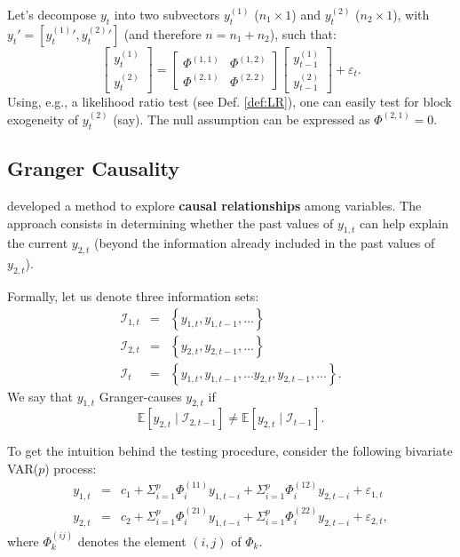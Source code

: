 \documentclass[
  12pt,
]{book}
\theoremstyle{definition}
\theoremstyle{definition}
\theoremstyle{definition}
\theoremstyle{definition}
\theoremstyle{remark}
\begin{document}
Let's decompose \(y_t\) into two subvectors \(y^{(1)}_{t}\) (\(n_1 \times 1\)) and \(y^{(2)}_{t}\) (\(n_2 \times 1\)), with \(y_t' = [{y^{(1)}_{t}}',{y^{(2)}_{t}}']\) (and therefore \(n=n_1 +n_2\)), such that:
\[
\left[
\begin{array}{c}
y^{(1)}_{t}\\
y^{(2)}_{t}
\end{array}
\right] = \left[
\begin{array}{cc}
\Phi^{(1,1)} & \Phi^{(1,2)}\\
\Phi^{(2,1)} & \Phi^{(2,2)}
\end{array}
\right]
\left[
\begin{array}{c}
y^{(1)}_{t-1}\\
y^{(2)}_{t-1}
\end{array}
\right] + \varepsilon_t.
\]
Using, e.g., a likelihood ratio test (see Def. \ref{def:LR}), one can easily test for block exogeneity of \(y_t^{(2)}\) (say). The null assumption can be expressed as \(\Phi^{(2,1)}=0\).

\hypertarget{granger-causality}{%
\subsection{Granger Causality}\label{granger-causality}}

\citet{Granger_1969} developed a method to explore \textbf{causal relationships} among variables. The approach consists in determining whether the past values of \(y_{1,t}\) can help explain the current \(y_{2,t}\) (beyond the information already included in the past values of \(y_{2,t}\)).

Formally, let us denote three information sets:
\begin{eqnarray*}
\mathcal{I}_{1,t} & = & \left\{ y_{1,t},y_{1,t-1},\ldots\right\} \\
\mathcal{I}_{2,t} & = & \left\{ y_{2,t},y_{2,t-1},\ldots\right\} \\
\mathcal{I}_{t} & = & \left\{ y_{1,t},y_{1,t-1},\ldots y_{2,t},y_{2,t-1},\ldots\right\}.
\end{eqnarray*}
We say that \(y_{1,t}\) Granger-causes \(y_{2,t}\) if
\[
\mathbb{E}\left[y_{2,t}\mid \mathcal{I}_{2,t-1}\right]\neq \mathbb{E}\left[y_{2,t}\mid \mathcal{I}_{t-1}\right].
\]

To get the intuition behind the testing procedure, consider the following
bivariate VAR(\(p\)) process:
\begin{eqnarray*}
y_{1,t} & = & c_1+\Sigma_{i=1}^{p}\Phi_i^{(11)}y_{1,t-i}+\Sigma_{i=1}^{p}\Phi_i^{(12)}y_{2,t-i}+\varepsilon_{1,t}\\
y_{2,t} & = & c_2+\Sigma_{i=1}^{p}\Phi_i^{(21)}y_{1,t-i}+\Sigma_{i=1}^{p}\Phi_i^{(22)}y_{2,t-i}+\varepsilon_{2,t},
\end{eqnarray*}
where \(\Phi_k^{(ij)}\) denotes the element \((i,j)\) of \(\Phi_k\).
\end{document}
